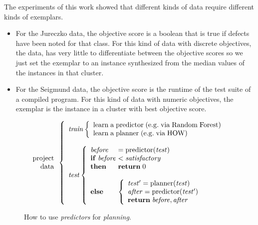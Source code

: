 \documentclass[conference]{IEEEtran}
\newcommand{\bi}{\begin{itemize}}
\newcommand{\ei}{\end{itemize}}
\begin{document}
The experiments of this work showed that different kinds of data require
different kinds of exemplars.
\bi
\item
For the Jureczko data, the objective score
is a boolean that is true if defects have been noted
for that class. 
For this kind of data with discrete objectives,
the data, 
has very little to  differentiate between the objective scores
so we just set the exemplar to  
an instance synthesized from the median values of the instances
in that cluster.
\item
For the Seigmund data,
the objective score is the runtime of the test suite of a compiled program.
For this kind of data with numeric objectives,
the exemplar  is the instance in a cluster
with  best objective score.
\ei 

  
  
\begin{figure}[!t]
\small 
\[
\begin{array}{r}
\mathrm{project}\\
\mathrm{data}
\end{array} 
\left\{\begin{array}{l}\mathit{train}
        \left\{\begin{array}{l}
                \mathrm{learn\;a\;}\mathrm{predictor\;}\mathrm{(e.g.\;via \;Random\;Forest)}\\
                \mathrm{learn\;a\;}\mathrm{planner\;}\mathrm{(e.g.\;via \; HOW)}
              \end{array}\right.
       \\
      ~\\
\mathit{test}  
    \left\{\begin{array}{l@{~}l}
           \mathit{before}& =\mathrm{predictor}(\mathit{test})\\
           \mathrm{\bf if\;}\mathit{before} & <  \mathit{satisfactory}\\
           \mathrm{\bf then}  & \mathrm{{\bf return}\; 0}\\~\\
           \mathrm{\bf else} &
           \left\{
            \begin{array}{l}
                \mathit{test'} = \mathrm{planner}(\mathit{test})\\
                \mathit{after} =\mathrm{predictor}(\mathit{test'})\\ 
                \mathrm{{\bf return}\;} \mathit{before},\mathit{after}
            \end{array}
          \right.
   \end{array}\right.
\end{array} \right. 
\]
 
\caption{How to use {\em predictors} for {\em planning}.}\label{fig:work}
\end{figure}
\end{document}
